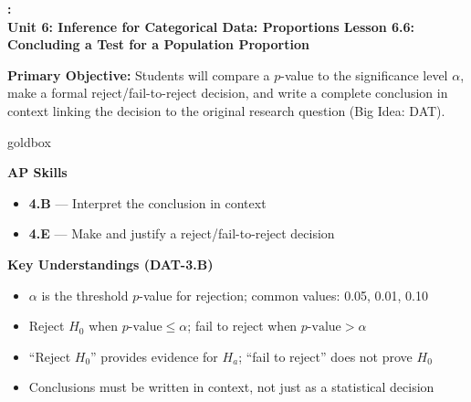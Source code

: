 \documentclass[10pt]{article}
\newcommand{\UnitNumberName}{Unit 6: Inference for Categorical Data: Proportions \quad}
\newcommand{\LessonNumberName}{Lesson 6.6: Concluding a Test for a Population Proportion}
\begin{document}
\begin{center}
    {\Large\bfseries \CourseName: \SchoolYear \\
    {\small\bfseries \UnitNumberName \LessonNumberName}}
\end{center}

\begin{tcolorbox}[colback=sky, colframe=navy, boxrule=0.9pt, arc=2mm,
    left=2mm, right=2mm, top=1.5mm, bottom=1.5mm]
    \textbf{Primary Objective:} Students will compare a $p$-value to the significance level
    $\alpha$, make a formal reject/fail-to-reject decision, and write a complete conclusion
    in context linking the decision to the original research question (Big Idea: DAT).
\end{tcolorbox}

\renewcommand{\arraystretch}{1.6}
\begin{skillbox}{goldbox}
    \begin{minipage}[t]{0.48\linewidth}\vspace{0pt}
        \textbf{AP Skills}
        \begin{itemize}[leftmargin=1.2em]
            \item \textbf{4.B} --- Interpret the conclusion in context
            \item \textbf{4.E} --- Make and justify a reject/fail-to-reject decision
        \end{itemize}
    \end{minipage}\hfill
    \begin{minipage}[t]{0.48\linewidth}\vspace{0pt}
        \textbf{Key Understandings (DAT-3.B)}
        \begin{itemize}[leftmargin=1.2em]
            \item $\alpha$ is the threshold $p$-value for rejection; common values: 0.05, 0.01, 0.10
            \item Reject $H_0$ when $p\text{-value} \le \alpha$; fail to reject when $p\text{-value} > \alpha$
            \item ``Reject $H_0$'' provides evidence for $H_a$; ``fail to reject'' does not prove $H_0$
            \item Conclusions must be written in context, not just as a statistical decision
        \end{itemize}
    \end{minipage}
\end{skillbox}
\end{document}
